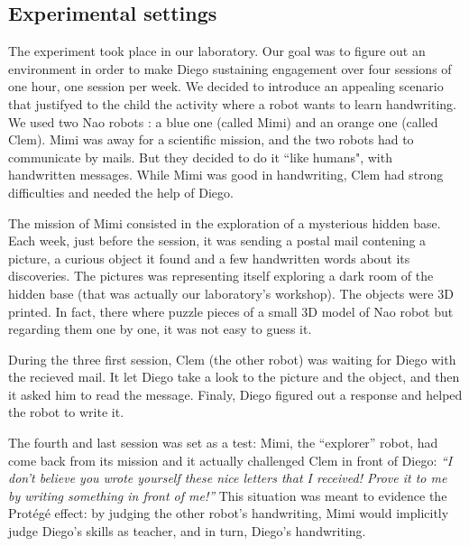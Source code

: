 \documentclass{sig-alternate}
\begin{document}

\subsection{Experimental settings}

The experiment took place in our laboratory. Our goal was to figure out 
an environment in order to make Diego sustaining
engagement over four sessions of one hour, one session per week. We decided 
to introduce an appealing scenario that justifyed to the child the activity 
where a robot wants to learn handwriting. We used two Nao robots : a blue one 
(called Mimi) and an orange one (called Clem). Mimi was away for a 
scientific mission, and the two robots had to communicate by mails. But they decided to do it 
``like humans", with handwritten messages. While Mimi was good in handwriting, 
Clem had strong difficulties and needed the help of Diego.

The mission of Mimi consisted in the exploration of a mysterious hidden
base. Each week, just before the session, it was sending a postal mail contening
a picture, a curious object it found and a few handwritten words about its discoveries. 
The pictures was representing itself exploring 
a dark room of the hidden base (that was actually our laboratory's workshop). 
The objects were 3D printed. In fact, there where puzzle pieces of a small 3D 
model of Nao robot but regarding them one by one, it was not easy to guess it.

During the three first session, Clem (the other robot) was waiting for Diego
with the recieved mail. It let Diego take a look to the picture and the object,
and then it asked him to read the message.
Finaly, Diego figured out a response and helped the robot to write it.

The fourth and last session was set as a test: Mimi, the ``explorer'' robot,
had come back from its mission and it actually challenged Clem in
front of Diego: \emph{``I don't believe you wrote yourself these nice letters that I
received! Prove it to me by writing something in front of me!''} This situation
was meant to evidence the Prot\'eg\'e effect: by judging the other robot's
handwriting, Mimi would implicitly judge Diego's skills as
teacher, and in turn, Diego's handwriting.
\end{document}
